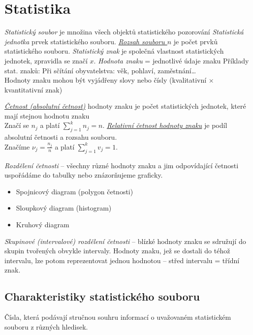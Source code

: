 
\def\f{\frac}
\section{Statistika}
\Def
\emph{Statistický soubor} je množina všech objektů statistického pozorování
\Def
\emph{Statistická jednotka} prvek statistického souboru.
\Def
\emph{\underline{Rozsah souboru $n$}} je počet prvků statistického souboru.
\Def
\emph{Statistický znak} je společná vlastnost statistických jednotek, zpravidla se značí $x$.
\Def
\emph{Hodnota znaku} = jednotlivé údaje znaku
Příklady stat. znaků:
Při sčítání obyvatelstva: věk, pohlaví, zaměstnání\dots\\
Hodnoty znaku mohou být vyjádřeny slovy nebo čísly (kvalitativní $\times$ kvantitativní znak)

\Def \emph{\underline{Četnost (absolutní četnost)}} hodnoty znaku je počet statistických jednotek, které mají stejnou hodnotu znaku\\
Značí se $n_j$ a platí $\sum_{j=1}^k n_j=n$.
\Def
\emph{\underline{Relativní četnost hodnoty znaku}} je podíl absolutní četnosti a rozsahu souboru.\\
Značíme $\nu_j = \f{n_j}{n}$ a platí  $\sum_{j=1}^k v_j = 1$.

\Def \emph{Rozdělení četnosti} -- všechny různé hodnoty znaku a jim odpovídající četnosti uspořádáme do tabulky nebo znázorňujeme graficky.
\begin{itemize}
	\item Spojnicový diagram (polygon četnosti)
	\item Sloupkový diagram (histogram)
	\item Kruhový diagram 	
\end{itemize}
\Def \emph{Skupinové (intervalové) rozdělení četnosti} -- blízké hodnoty znaku se sdružují do skupin tvořených obvykle intervaly. Hodnoty znaku, jež se dostali do téhož intervalu, lze potom reprezentovat jednou hodnotou -- střed intervalu = třídní znak.

\subsection{Charakteristiky statistického souboru}
\Poz Čísla, která podávají stručnou souhru informací o uvažovaném statistickém souboru z různých hledisek.

